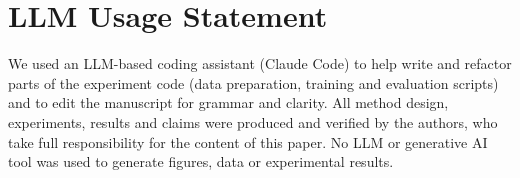 \section*{LLM Usage Statement}
\label{sec:llm_usage}
We used an LLM-based coding assistant (Claude Code) to help write and refactor parts of the
experiment code (data preparation, training and evaluation scripts) and to edit the manuscript
for grammar and clarity.
All method design, experiments, results and claims were produced and verified by the authors,
who take full responsibility for the content of this paper.
No LLM or generative AI tool was used to generate figures, data or experimental results.
